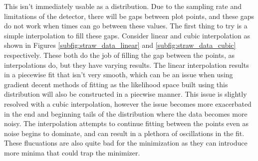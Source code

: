 This isn't immediately usable as a distribution. Due to the sampling rate and limitations of the detector, there will be gaps between plot points, and these gaps do not work when times can go between these values. The first thing to try is a simple interpolation to fill these gaps. Consider linear and cubic interpolation as shown in Figures \ref{subfig:straw_data_linear} and \ref{subfig:straw_data_cubic} respectively. These both do the job of filling the gap between the points, as interpolations do, but they have varying results. The linear interpolation results in a piecewise fit that isn't very smooth, which can be an issue when using gradient decent methods of fitting as the likelihood space built using this distribution will also be constructed in a piecwise manner. This issue is slightly resolved with a cubic interpolation, however the issue becomes more exacerbated in the end and beginning tails of the distribution where the data becomes more noisy. The interpolation attempts to continue fitting between the points even as noise begins to dominate, and can result in a plethora of oscillations in the fit. These flucuations are also quite bad for the minimization as they can introduce more minima that could trap the minimizer. 

